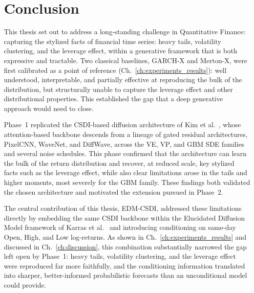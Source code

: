 \chapter{Conclusion}

This thesis set out to address a long-standing challenge in Quantitative Finance: capturing the stylized facts of financial time series: heavy tails, volatility clustering, and the leverage effect, within a generative framework that is both expressive and tractable. Two classical baselines, GARCH-X and Merton-X, were first calibrated as a point of reference (Ch.\ \ref{ch:experiments_results}): well understood, interpretable, and partially effective at reproducing the bulk of the distribution, but structurally unable to capture the leverage effect and other distributional properties. This established the gap that a deep generative approach would need to close.

Phase~1 replicated the CSDI-based diffusion architecture of Kim et al.\ \cite{kim2025diffusion}, whose attention-based backbone descends from a lineage of gated residual architectures, PixelCNN, WaveNet, and DiffWave, across the VE, VP, and GBM SDE families and several noise schedules. This phase confirmed that the architecture can learn the bulk of the return distribution and recover, at reduced scale, key stylized facts such as the leverage effect, while also clear limitations arose in the tails and higher moments, most severely for the GBM family. These findings both validated the chosen architecture and motivated the extension pursued in Phase~2.

The central contribution of this thesis, EDM-CSDI, addressed these limitations directly by embedding the same CSDI backbone within the Elucidated Diffusion Model framework of Karras et al.\ \cite{karras2022elucidating} and introducing conditioning on same-day Open, High, and Low log-returns. As shown in Ch.\ \ref{ch:experiments_results} and discussed in Ch.\ \ref{ch:discussion}, this combination substantially narrowed the gap left open by Phase~1: heavy tails, volatility clustering, and the leverage effect were reproduced far more faithfully, and the conditioning information translated into sharper, better-informed probabilistic forecasts than an unconditional model could provide.

